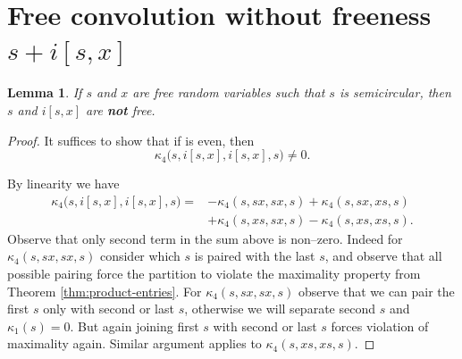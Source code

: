 \documentclass{amsart}
\newtheorem{lemma}[claim]{Lemma}
\begin{document}

\section{Free convolution without freeness $s+i[s,x]$}\label{Section:3}



\begin{lemma}\label{lem:31}
 If $ s $ and $ x $ are free random variables such that $s $ is semicircular, then $ s $ and $ i[s, x] $ are \textbf{not} free.
\end{lemma}
 
\begin{proof}
	
	
It suffices to show that if 
 is even, then 
\begin{equation}\label{k:even}
\kappa_{4}\big(s, i[s, x], i[s, x], s \big) \neq 0. 
\end{equation} 

By linearity we have
\begin{align*}
	\kappa_{4}\big(s, i[s, x], i[s, x], s \big) =&-\kappa_4(s,sx,sx,s)+\kappa_4(s,sx,xs,s)\\ &+\kappa_4(s,xs,sx,s)-\kappa_4(s,xs,xs,s).
\end{align*} 
Observe that only second term in the sum above is non--zero. Indeed for $\kappa_4(s,sx,sx,s)$ consider which $s$ is paired with the last $s$, and observe that all possible pairing force the partition to violate the maximality property from Theorem \ref{thm:product-entries}. For $\kappa_4(s,sx,sx,s)$ observe that we can pair the first $s$ only with second or last $s$, otherwise we will separate second $s$ and $\kappa_1(s)=0$. But again joining first $s$ with second or last $s$ forces violation of maximality again. Similar argument applies to $\kappa_4(s,xs,xs,s)$.


\end{proof}
\end{document}

